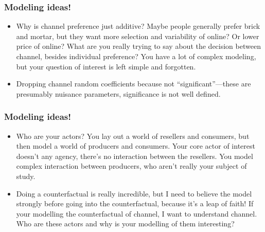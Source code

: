 \documentclass[aspectratio=169]{beamer}
\begin{document}
\begin{frame}
\frametitle{Modeling ideas!}

\begin{itemize}
\item Why is channel preference just additive? Maybe people generally prefer brick and mortar, but they want more selection and variability of online? Or lower price of online? What are you really trying to say about the decision between channel, besides individual preference? You have a lot of complex modeling, but your question of interest is left simple and forgotten.
\item Dropping channel random coefficients because not ``significant''---these are presumably nuisance parameters, significance is not well defined.
\end{itemize}
\end{frame}


\begin{frame}
\frametitle{Modeling ideas!}

\begin{itemize}
\item Who are your actors? You lay out a world of resellers and consumers, but then model a world of producers and consumers. Your core actor of interest doesn't any agency, there's no interaction between the resellers. You model complex interaction between producers, who aren't really your subject of study.
\item Doing a counterfactual is really incredible, but I need to believe the model strongly before going into the counterfactual, because it's a leap of faith! If your modelling the counterfactual of channel, I want to understand channel. Who are these actors and why is your modelling of them interesting?
\end{itemize}
\end{frame}
\end{document}
